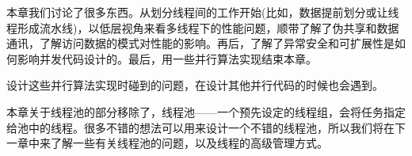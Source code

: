 
本章我们讨论了很多东西。从划分线程间的工作开始(比如，数据提前划分或让线程形成流水线)，以低层视角来看多线程下的性能问题，顺带了解了伪共享和数据通讯，了解访问数据的模式对性能的影响。再后，了解了异常安全和可扩展性是如何影响并发代码设计的。最后，用一些并行算法实现结束本章。

设计这些并行算法实现时碰到的问题，在设计其他并行代码的时候也会遇到。

本章关于线程池的部分移除了，线程池——一个预先设定的线程组，会将任务指定给池中的线程。很多不错的想法可以用来设计一个不错的线程池，所以我们将在下一章中来了解一些有关线程池的问题，以及线程的高级管理方式。